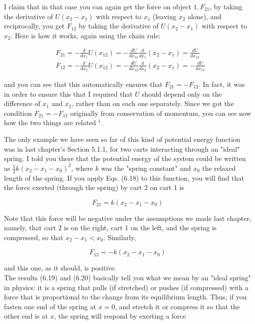 \documentclass[10pt]{article}
\begin{document}
I claim that in that case you can again get the force on object $1, F_{21}$, by taking the derivative of $U\left(x_{2}-x_{1}\right)$ with respect to $x_{1}$ (leaving $x_{2}$ alone), and reciprocally, you get $F_{12}$ by taking the derivative of $U\left(x_{2}-x_{1}\right)$ with respect to $x_{2}$. Here is how it works, again using the chain rule:


\begin{align*}
& F_{21}=-\frac{d}{d x_{1}} U\left(x_{12}\right)=-\frac{d U}{d x_{12}} \frac{d}{d x_{1}}\left(x_{2}-x_{1}\right)=\frac{d U}{d x_{12}} \\
& F_{12}=-\frac{d}{d x_{2}} U\left(x_{12}\right)=-\frac{d U}{d x_{12}} \frac{d}{d x_{2}}\left(x_{2}-x_{1}\right)=-\frac{d U}{d x_{12}} \tag{6.18}
\end{align*}


and you can see that this automatically ensures that $F_{21}=-F_{12}$. In fact, it was in order to ensure this that I required that $U$ should depend only on the difference of $x_{1}$ and $x_{2}$, rather than on each one separately. Since we got the condition $F_{21}=-F_{12}$ originally from conservation of momentum, you can see now how the two things are related ${ }^{1}$.

The only example we have seen so far of this kind of potential energy function was in last chapter's Section 5.1.1, for two carts interacting through an "ideal" spring. I told you there that the potential energy of the system could be written as $\frac{1}{2} k\left(x_{2}-x_{1}-x_{0}\right)^{2}$, where $k$ was the "spring constant" and $x_{0}$ the relaxed length of the spring. If you apply Eqs. (6.18) to this function, you will find that the force exerted (through the spring) by cart 2 on cart 1 is


\begin{equation*}
F_{21}=k\left(x_{2}-x_{1}-x_{0}\right) \tag{6.19}
\end{equation*}


Note that this force will be negative under the assumptions we made last chapter, namely, that cart 2 is on the right, cart 1 on the left, and the spring is compressed, so that $x_{2}-x_{1}<x_{0}$. Similarly,


\begin{equation*}
F_{12}=-k\left(x_{2}-x_{1}-x_{0}\right) \tag{6.20}
\end{equation*}


and this one, as it should, is positive.\\
The results (6.19) and (6.20) basically tell you what we mean by an "ideal spring" in physics: it is a spring that pulls (if stretched) or pushes (if compressed) with a force that is proportional to the change from its equilibrium length. Thus, if you fasten one end of the spring at $x=0$, and stretch it or compress it so that the other end is at $x$, the spring will respond by exerting a force
\end{document}
